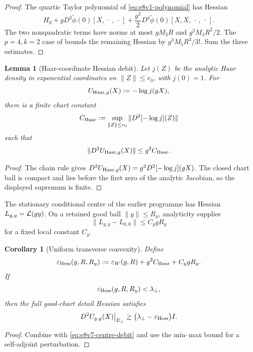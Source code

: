 \documentclass[11pt,oneside]{book}
\newtheorem{lemma}[theorem]{Lemma}
\newtheorem{corollary}[theorem]{Corollary}
\theoremstyle{definition}
\theoremstyle{remark}
\begin{document}
\begin{proof}
The quartic Taylor polynomial of
\eqref{eq:e8v1-polynomial} has Hessian
\[
 H_0+gD^3\widetilde\phi(0)[X,\,\cdot\,,\,\cdot\,]
 +\frac{g^2}{2}D^4\widetilde\phi(0)
       [X,X,\,\cdot\,,\,\cdot\,].
\]
The two nonquadratic terms have norms at most
\(gM_3R\) and \(g^2M_4R^2/2\).  The \(p=4,k=2\) case of
 bounds the remaining Hessian by
\(g^3M_5R^3/3!\).  Sum the three estimates.
\end{proof}

\begin{lemma}[Haar-coordinate Hessian debit]
\label{lem:e8v7-Haar}
Let \(j(Z)\) be the analytic Haar density in exponential coordinates
on \(\|Z\|\le r_0\), with \(j(0)=1\).  For
\[
 U_{{\rm Haar},g}(X):=-\log j(gX),                  \label{eq:e8v7-Haar-potential}
\]
there is a finite chart constant
\[
 C_{\rm Haar}:=
 \sup_{\|Z\|\le r_0}\|D^2[-\log j](Z)\|             \label{eq:e8v7-CHaar}
\]
such that
\[
 \|D^2U_{{\rm Haar},g}(X)\|\le g^2C_{\rm Haar}.      \label{eq:e8v7-Haar-debit}
\]
\end{lemma}

\begin{proof}
The chain rule gives
\(D^2U_{{\rm Haar},g}(X)=g^2D^2[-\log j](gX)\).
The closed chart ball is compact and lies before the first zero of
the analytic Jacobian, so the displayed supremum is finite.
\end{proof}

The stationary conditional centre of the earlier programme has
Hessian \(L_{g,y}={\cal L}(gy)\).  On a retained good ball
\(\|y\|\le R_y\), analyticity supplies
\[
 \|L_{g,y}-L_{0,0}\|\le C_y gR_y                  \label{eq:e8v7-centre-debit}
\]
for a fixed local constant \(C_y\).

\begin{corollary}[Uniform transverse convexity]
\label{cor:e8v7-convexity}
Define
\[
 \varepsilon_{\rm Hess}(g,R,R_y):=
 \varepsilon_W(g,R)+g^2C_{\rm Haar}+C_ygR_y.         \label{eq:e8v7-total-debit}
\]
If
\[
 \varepsilon_{\rm Hess}(g,R,R_y)<\lambda_\perp,      \label{eq:e8v7-convexity-gate}
\]
then the full good-chart detail Hessian satisfies
\[
 D^2U_{g,y}(X)\big|_{E_\perp}
 \ge
 \bigl(\lambda_\perp-\varepsilon_{\rm Hess}\bigr)I. \label{eq:e8v7-convexity}
\]
\end{corollary}

\begin{proof}
Combine
 with \eqref{eq:e8v7-centre-debit} and use the
min--max bound for a self-adjoint perturbation.
\end{proof}
\end{document}
